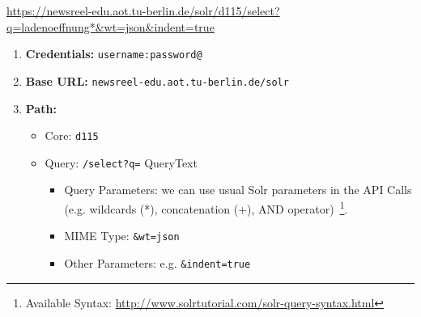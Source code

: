 \url{https://newsreel-edu.aot.tu-berlin.de/solr/d115/select?q=ladenoeffnung*&wt=json&indent=true}
\begin{enumerate}
	\itemsep0em
	\item \textbf{Credentials: } \texttt{username:password@}
	\item \textbf{Base URL:} \texttt{newsreel-edu.aot.tu-berlin.de/solr}
	\item  \textbf{Path:}	
	\begin{itemize}
		\itemsep0em
		\item Core: \texttt{d115}
		\item Query: \texttt{/select?q=} QueryText
		\begin{itemize}
\itemsep0em
			\item Query Parameters: we can use usual Solr parameters in the API Calls (e.g. wildcards (*), concatenation (+), AND operator)~\footnote{Available Syntax: \url{http://www.solrtutorial.com/solr-query-syntax.html}}.
			\item MIME Type: \texttt{&wt=json}
			\item Other Parameters: e.g. \texttt{&indent=true}
					\end{itemize}
		
	\end{itemize}
	
\end{enumerate}



%
%
%
%
%
%



%
%




%
%




